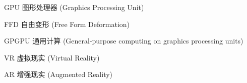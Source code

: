 \begin{denotation}

\item[GPU] 图形处理器 (Graphics Processing Unit)
\item[FFD] 自由变形 (Free Form Deformation)
\item[GPGPU] 通用计算 (General-purpose computing on graphics processing units)
\item[VR] 虚拟现实 (Virtual Reality)
\item[AR] 增强现实 (Augmented Reality)

\end{denotation}
